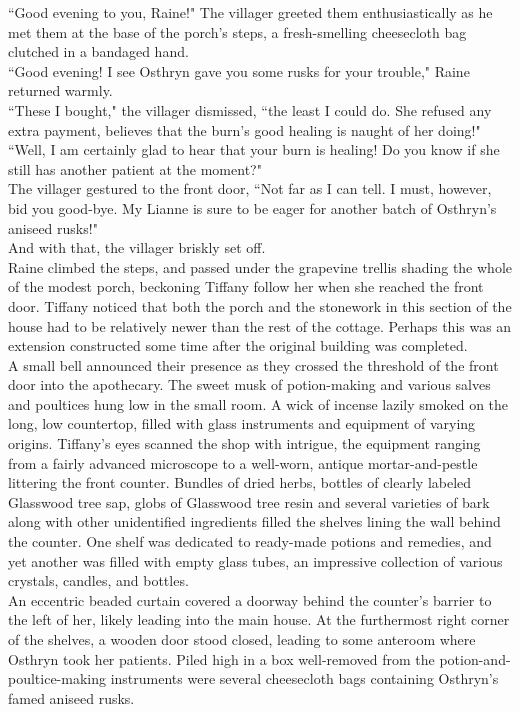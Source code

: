 ``Good evening to you, Raine!" The villager greeted them enthusiastically as he met them at the base of the porch's steps, a fresh-smelling cheesecloth bag clutched in a bandaged hand.\\
``Good evening! I see Osthryn gave you some rusks for your trouble," Raine returned warmly.\\
``These I bought," the villager dismissed, ``the least I could do. She refused any extra payment, believes that the burn's good healing is naught of her doing!"\\
``Well, I am certainly glad to hear that your burn is healing! Do you know if she still has another patient at the moment?"\\
The villager gestured to the front door, ``Not far as I can tell. I must, however, bid you good-bye. My Lianne is sure to be eager for another batch of Osthryn's aniseed rusks!"\\
And with that, the villager briskly set off.\\

Raine climbed the steps, and passed under the grapevine trellis shading the whole of the modest porch, beckoning Tiffany follow her when she reached the front door.
Tiffany noticed that both the porch and the stonework in this section of the house had to be relatively newer than the rest of the cottage.
Perhaps this was an extension constructed some time after the original building was completed.\\

A small bell announced their presence as they crossed the threshold of the front door into the apothecary.
The sweet musk of potion-making and various salves and poultices hung low in the small room. 
A wick of incense lazily smoked on the long, low countertop, filled with glass instruments and equipment of varying origins.
Tiffany's eyes scanned the shop with intrigue, the equipment ranging from a fairly advanced microscope to a well-worn, antique mortar-and-pestle littering the front counter.
Bundles of dried herbs, bottles of clearly labeled Glasswood tree sap, globs of Glasswood tree resin and several varieties of bark along with other unidentified ingredients filled the shelves lining the wall behind the counter. 
One shelf was dedicated to ready-made potions and remedies, and yet another was filled with empty glass tubes, an impressive collection of various crystals, candles, and bottles.\\

An eccentric beaded curtain covered a doorway behind the counter's barrier to the left of her, likely leading into the main house. 
At the furthermost right corner of the shelves, a wooden door stood closed, leading to some anteroom where Osthryn took her patients.
Piled high in a box well-removed from the potion-and-poultice-making instruments were several cheesecloth bags containing Osthryn's famed aniseed rusks.\\

